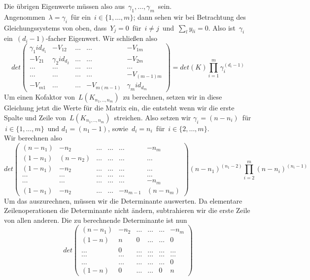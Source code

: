Die übrigen Eigenwerte müssen also aus $\,\gamma_1,\ldots,\gamma_m\,$ sein.\\
Angenommen $\,\lambda=\gamma_i\,$ für ein $\,i\in\{1,\ldots,m\}$; dann sehen wir bei Betrachtung des Gleichungssystems von oben, dass $\,Y_j=0\,$ für $\,i\neq j\,$ und $\,\sum_ly_{li}=0$.\; 
Also ist $\,\gamma_i\,$ ein $\,(d_i-1)$-facher Eigenwert.
Wir schließen also
\begin{equation}
{det
\begin{pmatrix}
 {\gamma_1}id_{d_1}&-V_{12}&\ldots&\ldots&-V_{1m}\\
 -V_{21}&{\gamma_2}id_{d_2}&\ldots&\ldots&-V_{2m}\\
 \ldots&\ldots&\ldots&\ldots&\ldots\\
  \ldots&\ldots&\ldots&\ldots&-V_{(m-1)m}\\
 -V_{m1}&\ldots&\ldots&-V_{m(m-1)}&{\gamma_m}id_{d_m}
\end{pmatrix}
}
={det(K)\prod_{i=1}^m \gamma_i^{(d_i -1)}}
\end{equation}
Um einen Kofaktor von $\,L(K_{n_1,..,n_m})\,$ zu berechnen, setzen wir in diese Gleichung jetzt die Werte für die Matrix ein, die entsteht wenn wir die erste Spalte und Zeile von $\,L(K_{n_1,..,n_m})\,$ streichen. Also setzen wir 
$\gamma_i=(n-n_i)\,$ für $\,i\in\{1,\ldots,m\}\,$ und
$d_1=(n_1 -1)$,\;\; sowie $\,d_i=n_i\,$ für $\,i\in\{2,\ldots,m\}$.\; \\
Wir berechnen also
\begin{equation}
\label{vmp_1}
det
\begin{pmatrix}
 (n-n_1)&-n_2&\ldots&\ldots&\ldots&-n_m\\
 (1-n_1)&(n-n_2)&\ldots&\ldots&\ldots&\ldots\\
 (1-n_1)&-n_2&\ldots&\ldots&\ldots&\ldots\\
 \ldots&\ldots&\ldots&\ldots&\ldots&\ldots\\
 \ldots&\ldots&\ldots&\ldots&\ldots&-n_m\\
 (1-n_1)&-n_2&\ldots&\ldots&-n_{m-1}&(n-n_m)
\end{pmatrix}
(n-n_1)^{(n_1 -2)}\prod_{i=2}^m (n-n_i)^{(n_i -1)}
\end{equation}
Um das auszurechnen, müssen wir die Determinante auswerten. 
Da elementare Zeilenoperationen die Determinante nicht ändern, subtrahieren wir die erste Zeile von allen anderen. Die zu berechnende Determinante ist nun
\begin{equation}
det
\begin{pmatrix}
 (n-n_1)&-n_2&\ldots&\ldots&\ldots&-n_m\\
 (1-n)&n&0&\ldots&\ldots&0\\
 \ldots&0&\ldots&\ldots&\ldots&\ldots\\
 \ldots&\ldots&\ldots&\ldots&\ldots&\ldots\\
 \ldots&\ldots&\ldots&\ldots&\ldots&0\\
 (1-n)&0&\ldots&\ldots&0&n
\end{pmatrix}
\end{equation}
